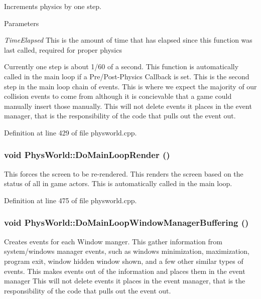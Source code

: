 Increments physics by one step. 
\begin{DoxyParams}{Parameters}
\item[{\em TimeElapsed}]This is the amount of time that has elapsed since this function was last called, required for proper physics\end{DoxyParams}
Currently one step is about 1/60 of a second. This function is automatically called in the main loop if a Pre/Post-\/Physics Callback is set. This is the second step in the main loop chain of events. This is where we expect the majority of our collision events to come from although it is concievable that a game could manually insert those manually. This will not delete events it places in the event manager, that is the responsibility of the code that pulls out the event out. 

Definition at line 429 of file physworld.cpp.\hypertarget{classPhysWorld_a8f33541d67164a2452e568443e9905be}{
\subsubsection[{DoMainLoopRender}]{\setlength{\rightskip}{0pt plus 5cm}void PhysWorld::DoMainLoopRender ()}}
\label{db/df5/classPhysWorld_a8f33541d67164a2452e568443e9905be}


This forces the screen to be re-\/rendered. This renders the screen based on the status of all in game actors. This is automatically called in the main loop. 

Definition at line 475 of file physworld.cpp.\hypertarget{classPhysWorld_ae81bab7f314d98f7b787c508e60c9c9a}{
\subsubsection[{DoMainLoopWindowManagerBuffering}]{\setlength{\rightskip}{0pt plus 5cm}void PhysWorld::DoMainLoopWindowManagerBuffering ()}}
\label{db/df5/classPhysWorld_ae81bab7f314d98f7b787c508e60c9c9a}


Creates events for each Window manger. This gather information from system/windows manager events, such as windows minimization, maximization, program exit, window hidden window shown, and a few other similar types of events. This makes events out of the information and places them in the event manager This will not delete events it places in the event manager, that is the responsibility of the code that pulls out the event out. 

